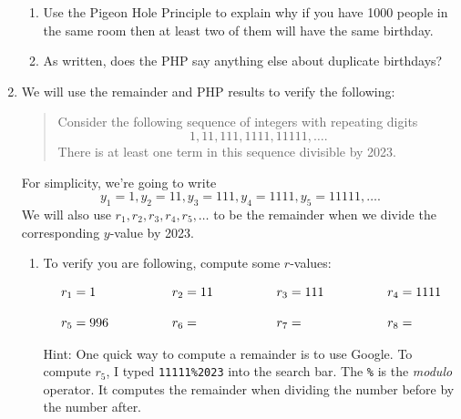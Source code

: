 \documentclass[12pt]{article}
\begin{document}
\begin{enumerate}
			\begin{enumerate}
				\item Use the Pigeon Hole Principle to explain why if you have 1000 people in the same room then at least two of them will have the same birthday.\vfill
				\item As written, does the PHP say anything else about duplicate birthdays?\vfill
			\end{enumerate}
		\newpage
		\item We will use the remainder and PHP results to verify the following:
			\begin{quote}
				Consider the following sequence of integers with repeating digits
					$$1,11,111,1111,11111,\dots.$$
				There is at least one term in this sequence divisible by 2023.
			\end{quote}
			For simplicity, we're going to write
				$$y_1=1, y_2=11,y_3=111,y_4=1111,y_5=11111,\dots.$$
			We will also use $r_1,r_2,r_3,r_4,r_5,\dots$ to be the remainder when we divide the corresponding $y$-value by 2023.
			\begin{enumerate}
				\item To verify you are following, compute some $r$-values:
				
					$$\begin{array}{lllllll}
						r_1=1&\hspace*{3em}&r_2=11&\hspace*{3em}&r_3=111&\hspace*{3em}&r_4=1111\\ \\
						r_5=996&&r_6=&&r_7=&&r_8=
					\end{array}$$
				
					Hint: One quick way to compute a remainder is to use Google.  To compute $r_5$, I typed \texttt{11111\%2023} into the search bar.  The \texttt{\%} is the \emph{modulo} operator.  It computes the remainder when dividing the number before by the number after.
					

\end{enumerate}
\end{enumerate}
\end{document}
